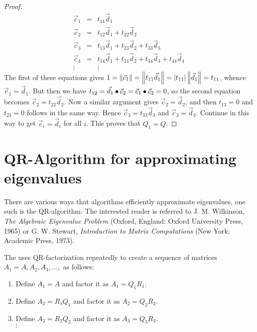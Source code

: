 \documentclass{ximera}
\begin{document}
\begin{proof}
\begin{equation*}
\begin{array}{ccl}
\vec{c}_{1} &=& t_{11}\vec{d}_{1} \\
\vec{c}_{2} &=& t_{12}\vec{d}_{1} + t_{22}\vec{d}_{2} \\
\vec{c}_{3} &=& t_{13}\vec{d}_{1} + t_{23}\vec{d}_{2} + t_{33}\vec{d}_{3} \\
\vec{c}_{4} &=& t_{14}\vec{d}_{1} + t_{24}\vec{d}_{2} + t_{34}\vec{d}_{3} + t_{44}\vec{d}_{4} \\
\vdots && \vdots
\end{array}
\end{equation*}
The first of these equations gives $1 = \left\| \vec{c}_{1} \right\| = \left\| t_{11}\vec{d}_{1} \right\| = | t_{11} | \left\| \vec{d}_{1} \right\| = t_{11}$, whence $\vec{c}_{1} = \vec{d}_{1}$. But then we have $t_{12} = \vec{d}_{1} \bullet \vec{c}_{2} = \vec{c}_{1} \bullet \vec{c}_{2} = 0$, so the second equation becomes $\vec{c}_{2} = t_{22}\vec{d}_{2}$. Now a similar argument gives $\vec{c}_{2} = \vec{d}_{2}$, and then $t_{13} = 0$ and $t_{23} = 0$ follows in the same way. Hence $\vec{c}_{3} = t_{33}\vec{d}_{3}$ and $\vec{c}_{3} = \vec{d}_{3}$. Continue in this way to get $\vec{c}_{i} = \vec{d}_{i}$ for all $i$. This proves that $Q_{1} = Q$.
\end{proof}

    
\section*{QR-Algorithm for approximating eigenvalues}\label{sec:QRalgorithm}
    
There are various ways that algorithms efficiently approximate eigenvalues, one such is the QR-algorithm. The interested reader is referred to
    J. M. Wilkinson, \textit{The Algebraic Eigenvalue Problem} (Oxford, England: Oxford University Press, 1965) or G. W. Stewart, \textit{Introduction to Matrix Computations} (New York: Academic Press, 1973).
    
The  uses QR-factorization repeatedly to create a sequence of matrices $A_{1} =A, A_{2}, A_{3}, \dots,$ as follows:
    
\begin{enumerate}
\item Define $A_{1} = A$ and factor it as $A_{1} = Q_{1}R_{1}$.
    
\item Define $A_{2} = R_{1}Q_{1}$ and factor it as $A_{2} = Q_{2}R_{2}$.
    
\item Define $A_{3} = R_{2}Q_{2}$ and factor it as $A_{3} = Q_{3}R_{3}$.
\\ \hspace*{4em} $\vdots$
    
    
\end{enumerate}
    
\end{document}
